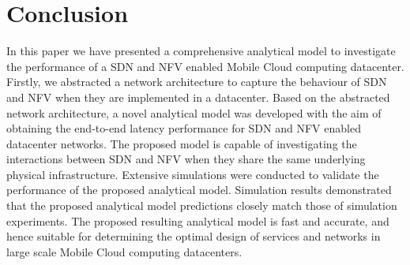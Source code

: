 
\section{Conclusion}
\label{sec:conclusions}

In this paper we have presented a comprehensive analytical model to investigate the performance of a SDN and NFV enabled Mobile Cloud computing datacenter. Firstly, we abstracted a network architecture to capture the behaviour of SDN and NFV when they are implemented in a datacenter. Based on the abstracted network architecture, a novel analytical model was developed with the aim of obtaining the end-to-end latency performance for SDN and NFV enabled datacenter networks. The proposed model is capable of investigating the interactions between SDN and NFV when they share the same underlying physical infrastructure. Extensive simulations were conducted to validate the performance of the proposed analytical model. Simulation results demonstrated that the proposed analytical model predictions closely match those of simulation experiments. The proposed resulting analytical model is fast and accurate, and hence suitable for determining the optimal design of services and networks in large scale Mobile Cloud computing datacenters.